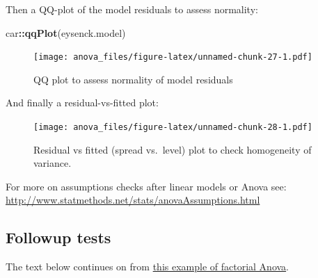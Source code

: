 \documentclass[]{article}
\newenvironment{Shaded}{\begin{snugshade}}{\end{snugshade}}
\newcommand{\KeywordTok}[1]{\textcolor[rgb]{0.13,0.29,0.53}{\textbf{#1}}}
\newcommand{\DataTypeTok}[1]{\textcolor[rgb]{0.13,0.29,0.53}{#1}}
\newcommand{\StringTok}[1]{\textcolor[rgb]{0.31,0.60,0.02}{#1}}
\newcommand{\CommentTok}[1]{\textcolor[rgb]{0.56,0.35,0.01}{\textit{#1}}}
\newcommand{\OperatorTok}[1]{\textcolor[rgb]{0.81,0.36,0.00}{\textbf{#1}}}
\newcommand{\NormalTok}[1]{#1}
\theoremstyle{definition}
\theoremstyle{definition}
\theoremstyle{definition}
\theoremstyle{remark}
\begin{document}
Then a QQ-plot of the model residuals to assess normality:

\begin{Shaded}
\begin{Highlighting}[]
\NormalTok{car}\OperatorTok{::}\KeywordTok{qqPlot}\NormalTok{(eysenck.model)}
\end{Highlighting}
\end{Shaded}

\begin{figure}
\centering
\texttt{[image: anova\_files/figure-latex/unnamed-chunk-27-1.pdf]}
\caption{\label{fig:unnamed-chunk-27}QQ plot to assess normality of model
residuals}
\end{figure}

And finally a residual-vs-fitted plot:

\begin{Shaded}
\end{Shaded}

\begin{figure}
\centering
\texttt{[image: anova\_files/figure-latex/unnamed-chunk-28-1.pdf]}
\caption{\label{fig:unnamed-chunk-28}Residual vs fitted (spread vs.~level)
plot to check homogeneity of variance.}
\end{figure}

For more on assumptions checks after linear models or Anova see:
\url{http://www.statmethods.net/stats/anovaAssumptions.html}

\subsection*{Followup tests}\label{followup-tests}

{The text below continues on from
\protect\hyperlink{howell-factorial-example}{this example of factorial
Anova}.}
\end{document}
